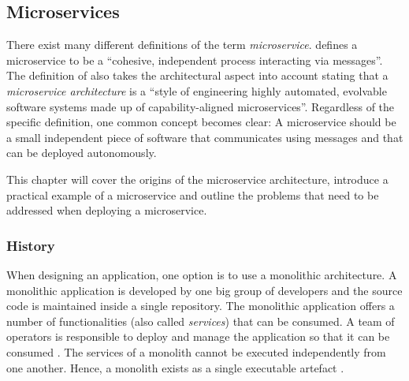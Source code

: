 
\subsection{Microservices}%
\label{sub:Microservices}

There exist many different definitions of the term \textit{microservice}.
\autocite{DragoniMicroservicesyesterdaytoday2016} defines a microservice to be
a \enquote{cohesive, independent process interacting via messages}. The
definition of \autocite{MikeAmundsenMicroserviceArchitecture2016} also takes
the architectural aspect into account stating that a \textit{microservice
architecture} is a \enquote{style of engineering highly automated, evolvable
software systems made up of capability-aligned microservices}. Regardless of
the specific definition, one common concept becomes clear: A microservice
should be a small independent piece of software that communicates using
messages and that can be deployed autonomously.

This chapter will cover the origins of the microservice architecture, introduce
a practical example of a microservice and outline the problems that need to be
addressed when deploying a microservice.

\subsubsection{History}%
\label{ssub:History}

When designing an application, one option is to use a monolithic architecture.
A monolithic application is developed by one big group of developers and the
source code is maintained inside a single repository. The monolithic
application offers a number of functionalities (also called \textit{services})
that can be consumed. A team of operators is responsible to deploy and manage
the application so that it can be consumed \autocite[p.
584]{VillamizarEvaluatingmonolithicmicroservice2015}. The services of a
monolith cannot be executed independently from one another. Hence, a monolith
exists as a single executable artefact \autocite[p.
1]{DragoniMicroservicesyesterdaytoday2016}.

